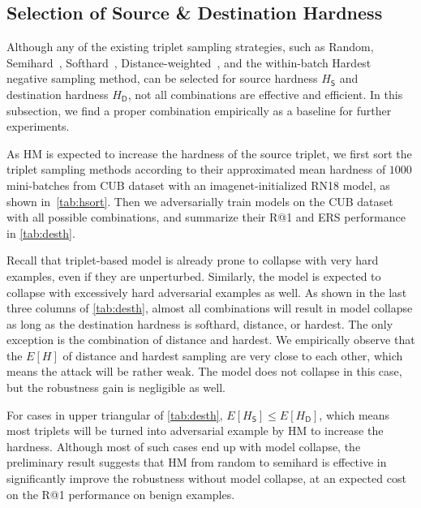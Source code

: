 \documentclass[10pt,twocolumn,letterpaper]{article}
\begin{document}
\subsection{Selection of Source \& Destination Hardness}
\label{sec:41}








Although any of the existing triplet sampling strategies, such as Random,
Semihard~\cite{facenet}, Softhard~\cite{revisiting},
Distance-weighted~\cite{distance}, and the within-batch Hardest negative
sampling method, can be selected for source hardness $H_\mathsf{S}$ and
destination hardness $H_\mathsf{D}$, not all combinations are effective and
efficient.
%
In this subsection, we find a proper combination empirically as a baseline for
further experiments.


As HM is expected to increase the hardness of the source triplet, we first sort
the triplet sampling methods according to their approximated mean hardness of
$1000$ mini-batches from CUB dataset with an imagenet-initialized RN18 model,
as shown in~\cref{tab:hsort}.
%
Then we adversarially train models on the CUB dataset with all possible
combinations, and summarize their R@1 and ERS performance in \cref{tab:desth}.


Recall that triplet-based model is already prone to collapse with very hard
examples, even if they are unperturbed.
%
Similarly, the model is expected to collapse with excessively hard adversarial
examples as well.
%
As shown in the last three columns of \cref{tab:desth}, almost all combinations
will result in model collapse as long as the destination hardness is softhard,
distance, or hardest.
%
The only exception is the combination of distance and hardest.
%
We empirically observe that the $E[H]$ of distance and hardest sampling are
very close to each other, which means the attack will be rather weak.
%
The model does not collapse in this case, but the robustness gain is negligible
as well.


For cases in upper triangular of \cref{tab:desth}, $E[H_\mathsf{S}] \leqslant E[H_\mathsf{D}]$,
which means most triplets will be turned into adversarial example by HM
to increase the hardness.
%
Although most of such cases end up with model collapse, the preliminary 
result suggests that HM from random to semihard is effective in significantly
improve the robustness without model collapse, at an expected cost on the R@1
performance on benign examples.
\end{document}
